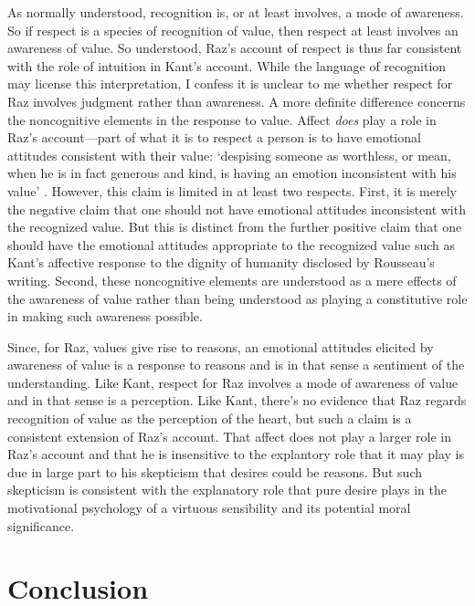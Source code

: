 \documentclass[a4paper,12pt]{article}
\begin{document}
As normally understood, recognition is, or at least involves, a mode of awareness. So if respect is a species of recognition of value, then respect at least involves an awareness of value. So understood, Raz's account of respect is thus far consistent with the role of intuition in Kant's account. While the language of recognition may license this interpretation, I confess it is unclear to me whether respect for Raz involves judgment rather than awareness. A more definite difference concerns the noncognitive elements in the response to value. Affect \emph{does} play a role in Raz's account---part of what it is to respect a person is to have emotional attitudes consistent with their value: `despising someone as worthless, or mean, when he is in fact generous and kind, is having an emotion inconsistent with his value' \citep[161]{Raz:2001ps}. However, this claim is limited in at least two respects. First, it is merely the negative claim that one should not have emotional attitudes inconsistent with the recognized value. But this is distinct from the further positive claim that one should have the emotional attitudes appropriate to the recognized value such as Kant's affective response to the dignity of humanity disclosed by Rousseau's writing. Second, these noncognitive elements are understood as a mere effects of the awareness of value rather than being understood as playing a constitutive role in making such awareness possible. 

Since, for Raz, values give rise to reasons, an emotional attitudes elicited by awareness of value is a response to reasons and is in that sense a sentiment of the understanding. Like Kant, respect for Raz involves a mode of awareness of value and in that sense is a perception. Like Kant, there's no evidence that Raz regards recognition of value as the perception of the heart, but such a claim is a consistent extension of Raz's account. That affect does not play a larger role in Raz's account and that he is insensitive to the explantory role that it may play is due in large part to his skepticism that desires could be reasons. But such skepticism is consistent with the explanatory role that pure desire plays in the motivational psychology of a virtuous sensibility and its potential moral significance. 




\section{Conclusion} \label{sec:conclusion} %
\end{document}
